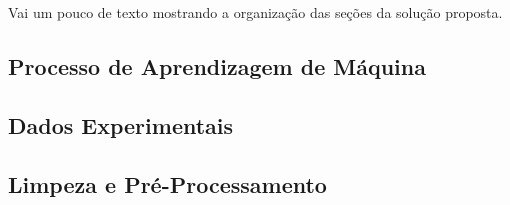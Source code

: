 Vai um pouco de texto mostrando a organização das seções da solução proposta.

\subsection{Processo de Aprendizagem de Máquina} \label{subsubsec:tarefa}


\subsection{Dados Experimentais} \label{subsubsec:dados}


\subsection{Limpeza e Pré-Processamento} \label{subsubsec:pre-process}


%
